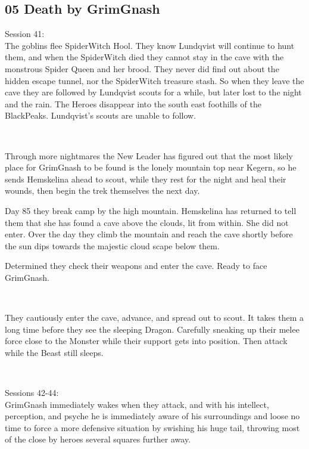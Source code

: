 \subsection*{05 Death by GrimGnash}

\forceindent Session 41:\\                                              %
The goblins flee SpiderWitch Hool. They know Lundqvist will continue to hunt them, and when the SpiderWitch died they cannot stay in the cave with the monstrous Spider Queen and her brood. They never did find out about the hidden escape tunnel, nor the SpiderWitch treasure stash. So when they leave the cave they are followed by Lundqvist scouts for a while, but later lost to the night and the rain. The Heroes disappear into the south east foothills of the BlackPeaks. Lundqvist's scouts are unable to follow.

\

Through more nightmares the New Leader has figured out that the most likely place for GrimGnash to be found is the lonely mountain top near Kegern, so he sends Hemskelina ahead to scout, while they rest for the night and heal their wounds, then begin the trek themselves the next day.

Day 85 they break camp by the high mountain. Hemskelina has returned to tell them that she has found a cave above the clouds, lit from within. She did not enter. Over the day they climb the mountain and reach the cave shortly before the sun dips towards the majestic cloud scape below them.

Determined they check their weapons and enter the cave. Ready to face GrimGnash.

\

They cautiously enter the cave, advance, and spread out to scout. It takes them a long time before they see the sleeping Dragon. Carefully sneaking up their melee force close to the Monster while their support gets into position. Then attack while the Beast still sleeps.

\


\forceindent Sessions 42-44:\\   
GrimGnash immediately wakes when they attack, and with his intellect, perception, and psyche he is immediately aware of his surroundings and loose no time to force a more defensive situation by swishing his huge tail, throwing most of the close by heroes several squares further away.

